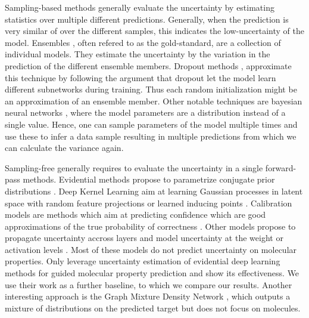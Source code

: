 Sampling-based methods generally evaluate the uncertainty by estimating statistics over multiple different predictions. Generally, when the prediction is very similar of over the different samples, this indicates the low-uncertainty of the model. Ensembles \citep{bayesian-classifier-combination,ensembles, dynamic-bayesian-combination-classifiers,batch-ensembles,hyper-ensembles}, often refered to as the gold-standard, are a collection of individual models. They estimate the uncertainty by the variation in the prediction of the different ensemble members. Dropout methods \cite{gal2016dropout}, approximate this technique by following the argument that dropout let the model learn different subnetworks during training. Thus each random initialization might be an approximation of an ensemble member. Other notable techniques are bayesian neural networks \citep{bayesian-networks, scalable-laplace-bnn, simple-baseline-uncertainty}, where the model parameters are a distribution instead of a single value. Hence, one can sample parameters of the model multiple times and use these to infer a data sample resulting in multiple predictions from which we can calculate the variance again. 

Sampling-free generally requires to evaluate the uncertainty in a single forward-pass methods. Evidential methods propose to parametrize conjugate prior distributions \citep{survey_evidential_uncertainty,dbu-robustness,max_gap_id_ood,uncertainty-generative-classifier,multifaceted_uncertainty,graph_posterior, lightweight-prob-net}. Deep Kernel Learning aim at learning Gaussian processes in latent space with random feature projections or learned inducing points \citep{uncertainty-distance-awareness, due, duq, uceloss}. Calibration models are methods which aim at predicting confidence which are good approximations of the true probability of correctness \citep{accurate-uncertainties-deep-learning-regression, confidence-aware-learning, individual-calibration, distribution-calibration-regression, intra-order-preserving}. Other models propose to propagate uncertainty accross layers and model uncertainty at the weight or activation levels \citep{natural-parameter-network, sampling-free-variance-propagation, feed-forward-propagation, lightweight-prob-net, probabilistic-backprop-scalable-bnn}. Most of these models do not predict uncertainty on molecular properties. Only \citet{soleimany2021evidential} leverage uncertainty estimation of evidential deep learning methods for guided molecular property prediction and show its effectiveness. We use their work as a further baseline, to which we compare our results. Another interesting approach is the Graph Mixture Density Network \cite{errica2021graph}, which outputs a mixture of distributions on the predicted target but does not focus on molecules.


